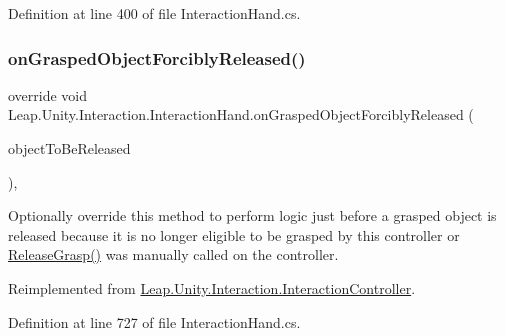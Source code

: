 Definition at line 400 of file Interaction\+Hand.\+cs.

\mbox{\label{class_leap_1_1_unity_1_1_interaction_1_1_interaction_hand_a1506a0d6e49010aedb6a8fe5a528d4fe}} 
\subsubsection{\texorpdfstring{onGraspedObjectForciblyReleased()}{onGraspedObjectForciblyReleased()}}
{\footnotesize\ttfamily override void Leap.\+Unity.\+Interaction.\+Interaction\+Hand.\+on\+Grasped\+Object\+Forcibly\+Released (\begin{DoxyParamCaption}\item[{\mbox{\hyperlink{interface_leap_1_1_unity_1_1_interaction_1_1_i_interaction_behaviour}{I\+Interaction\+Behaviour}}}]{object\+To\+Be\+Released }\end{DoxyParamCaption})\hspace{0.3cm}{\ttfamily [protected]}, {\ttfamily [virtual]}}



Optionally override this method to perform logic just before a grasped object is released because it is no longer eligible to be grasped by this controller or \mbox{\hyperlink{class_leap_1_1_unity_1_1_interaction_1_1_interaction_controller_a3468a89e21c685d6df962ce70684c92f}{Release\+Grasp()}} was manually called on the controller. 



Reimplemented from \mbox{\hyperlink{class_leap_1_1_unity_1_1_interaction_1_1_interaction_controller_a9850539b1321c83e5a71c5e47eef6df1}{Leap.\+Unity.\+Interaction.\+Interaction\+Controller}}.



Definition at line 727 of file Interaction\+Hand.\+cs.

\mbox{\label{class_leap_1_1_unity_1_1_interaction_1_1_interaction_hand_af6558dfad2bffcf4126ded024dc08c6d}} 
